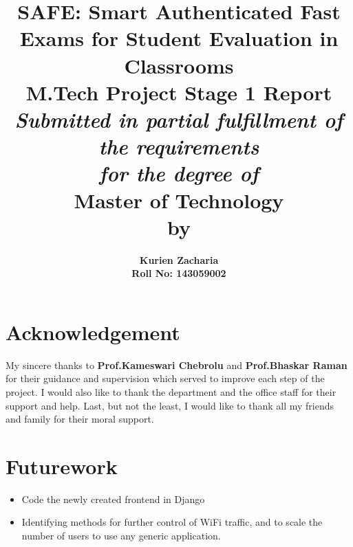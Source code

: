 \documentclass[12pt, a4paper]{article}
\title{ \textbf{SAFE: Smart Authenticated Fast Exams for Student Evaluation in Classrooms} \\
\vspace{1cm}  \normalsize{M.Tech Project Stage 1 Report} \vspace{1cm} \\
\textit{Submitted in partial fulfillment of the requirements} \\ \textit{for the degree of}  \\ \vspace{1cm} \textbf{Master of Technology} \\ \vspace{1cm} by }
\author{ \textbf{Kurien Zacharia}  \\ 
\vspace{1.5cm}
\textbf{Roll No: 143059002 }}
\begin{document}
 
\maketitle
\newpage

\newpage
{}
\pagestyle{plain}



\clearpage
\section*{\center\LARGE{Acknowledgement}}

  My sincere thanks to \textbf{Prof.Kameswari Chebrolu} and \textbf{Prof.Bhaskar Raman} for their guidance and supervision
  which served to improve each step of the project. I would also like to thank the department and the office staff for their support and help. Last, but not the least, I would like to thank all my friends and family for their moral support.
 


\clearpage
\tableofcontents
















 
 
 \section{Futurework}
 
 \begin{itemize}
  \item Code the newly created frontend in Django
  \item Identifying methods for further control of WiFi traffic, and to scale the number of users to use any generic application.
  
 \end{itemize}

\clearpage


\end{document}
